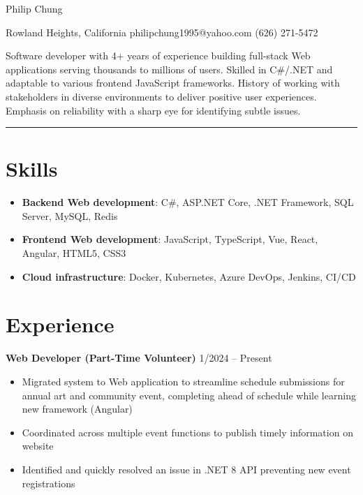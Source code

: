 \documentclass[12pt]{article}
\newcommand{\primaryheader}[4]{
	\textbf{#1}
	\ifthenelse{\equal{#3}{}}{}{%
		\symbol{"B7} #3 \ifthenelse{\equal{#4}{}}{}{(#4)}
	}
	\hfill #2%
}
\begin{document}
	{\centering

		{\headerfont\fontsize{24pt}{24pt}\selectfont Philip Chung}

		\vspace{0.25em}

		{\fontsize{10pt}{10pt}\selectfont Rowland Heights, California  philipchung1995@yahoo.com  (626) 271-5472}

	}

	\vspace{0.25em}

	{\fontsize{11pt}{14pt}\selectfont

		Software developer with 4+ years of experience building full-stack Web applications serving thousands to millions of users. Skilled in C\#/.NET and adaptable to various frontend JavaScript frameworks. History of working with stakeholders in diverse environments to deliver positive user experiences. Emphasis on reliability with a sharp eye for identifying subtle issues.

	}

	\rule{\textwidth}{1pt}

	\section*{Skills}

	\newcommand{\skillitem}[2]{\item \textbf{#1}: #2}

	\begin{itemize}[left=0.25in .. 0.25in,label={},itemindent=-0.25in]
		\skillitem{Backend Web development}{C\#, ASP.NET Core, .NET Framework, SQL Server, MySQL, Redis}
		\skillitem{Frontend Web development}{JavaScript, TypeScript, Vue, React, Angular, HTML5, CSS3}
		\skillitem{Cloud infrastructure}{Docker, Kubernetes, Azure DevOps, Jenkins, CI/CD}
	\end{itemize}

	\section*{Experience}

	\primaryheader{Web Developer (Part-Time Volunteer)}{1/2024 -- Present}{PNW}{Remote}

	\begin{itemize}
		\item Migrated system to Web application to streamline schedule submissions for annual art and community event, completing ahead of schedule while learning new framework (Angular)
		\item Coordinated across multiple event functions to publish timely information on website
		\item Identified and quickly resolved an issue in .NET 8 API preventing new event registrations
	\end{itemize}
\end{document}
